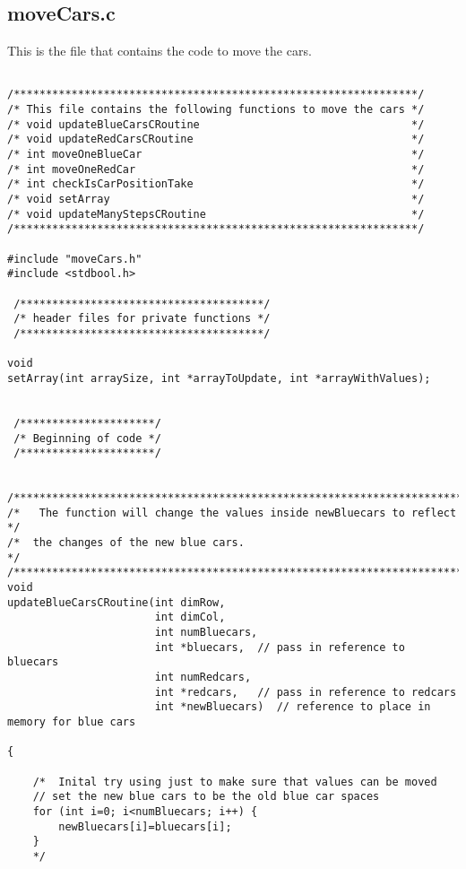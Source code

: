 \documentclass[11pt]{article}
\begin{document}
\subsection{moveCars.c}
\label{sec-4-4}

   This is the file that contains the code to move the cars.

\begin{verbatim}

/***************************************************************/
/* This file contains the following functions to move the cars */
/* void updateBlueCarsCRoutine                                 */
/* void updateRedCarsCRoutine                                  */
/* int moveOneBlueCar                                          */
/* int moveOneRedCar                                           */
/* int checkIsCarPositionTake                                  */
/* void setArray                                               */
/* void updateManyStepsCRoutine                                */
/***************************************************************/

#include "moveCars.h"
#include <stdbool.h>

 /**************************************/
 /* header files for private functions */
 /**************************************/

void
setArray(int arraySize, int *arrayToUpdate, int *arrayWithValues);


 /*********************/
 /* Beginning of code */
 /*********************/


/***************************************************************************/
/*   The function will change the values inside newBluecars to reflect     */
/*  the changes of the new blue cars.                                      */
/***************************************************************************/
void
updateBlueCarsCRoutine(int dimRow, 
                       int dimCol,
                       int numBluecars,
                       int *bluecars,  // pass in reference to bluecars
                       int numRedcars,
                       int *redcars,   // pass in reference to redcars
                       int *newBluecars)  // reference to place in memory for blue cars

{

    /*  Inital try using just to make sure that values can be moved
    // set the new blue cars to be the old blue car spaces
    for (int i=0; i<numBluecars; i++) {
        newBluecars[i]=bluecars[i];
    }
    */



\end{verbatim}
\end{document}
